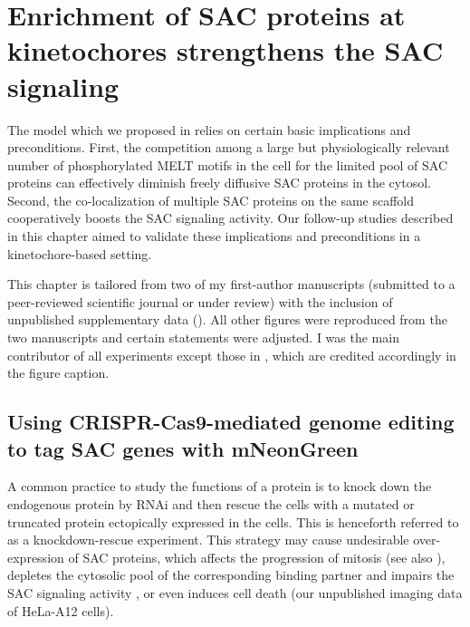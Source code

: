 \chapter{Enrichment of SAC proteins at kinetochores strengthens the SAC signaling}
\label{chpt:3}

The model which we proposed in  relies on certain basic implications and preconditions. First, the competition among a large but physiologically relevant number of phosphorylated MELT motifs in the cell for the limited pool of SAC proteins can effectively diminish freely diffusive SAC proteins in the cytosol. Second, the co-localization of multiple SAC proteins on the same  scaffold cooperatively boosts the SAC signaling activity. Our follow-up studies described in this chapter aimed to validate these implications and preconditions in a kinetochore-based setting.

This chapter is tailored from two of my first-author manuscripts (submitted to a peer-reviewed scientific journal or under review) with the inclusion of unpublished supplementary data (). All other figures were reproduced from the two manuscripts and certain statements were adjusted. I was the main contributor of all experiments except those in , which are credited accordingly in the figure caption.

\section{Using CRISPR-Cas9-mediated genome editing to tag SAC genes with mNeonGreen }
\label{TaggingSACProteins}

A common practice to study the functions of a protein is to knock down the endogenous protein by RNAi and then rescue the cells with a mutated or truncated protein ectopically expressed in the cells. This is henceforth referred to as a knockdown-rescue experiment.
This strategy may cause undesirable over-expression of SAC proteins, which affects the progression of mitosis \cite{Bub1Overexpression-AuroraBHyperactivation} (see also ), depletes the cytosolic pool of the corresponding binding partner and impairs the SAC signaling activity \cite{Bub3Competition, FissionYeastSACRobustness, ATMPhosphorylatesMad1S214, MAD1Overexpression_Ryan2012}, or even induces cell death (our unpublished imaging data of HeLa-A12 cells).

